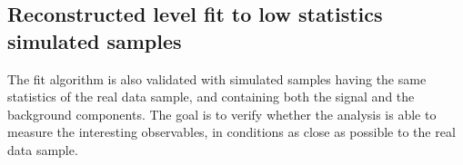 




\subsection{Reconstructed level fit to low statistics simulated samples}
\label{sec:datalike-MC}

The fit algorithm is also validated with simulated samples having the same statistics of the real data sample, and containing both the signal and the background components.
The goal is to verify whether the analysis is able to measure the interesting observables, in conditions as close as possible to the real data sample.

